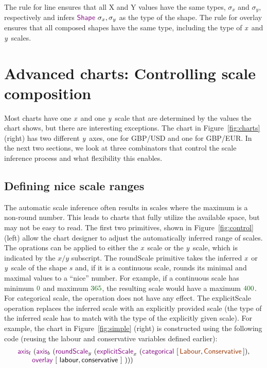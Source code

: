 \documentclass{jfp}
\newcommand{\X}{\emph{x}\ }
\newcommand{\Y}{\emph{y}\ }
\newcommand{\num}[1]{\textcolor{numclr}{#1}}
\newcommand{\strf}[1]{\textnormal{\textcolor{strclr}{\sffamily #1}}}
\newcommand{\ident}[1]{\textnormal{\textcolor{idclr}{\sffamily #1}}}
\newcommand{\kvd}[1]{\textnormal{\textcolor{kvdclr}{\sffamily #1}}}
\begin{document}
\vspace{-0.5em}
\noindent
The rule for \kvd{line} ensures that all X and Y values have the same types, $\sigma_x$ and $\sigma_y$,
respectively and infers $\kvd{Shape}~\sigma_x, \sigma_y$ as the type of the shape. The rule for
\kvd{overlay} ensures that all composed shapes have the same type, including the type of \X and \Y scales.

\section{Advanced charts: Controlling scale composition}
\label{sec:fancy}

Most charts have one \X and one \Y scale that are determined by the values the chart shows,
but there are interesting exceptions. The chart in Figure~\ref{fig:charts} (right)
has two different \Y axes, one for GBP/USD and one for GBP/EUR. In the next two sections, we look at
three combinators that control the scale inference process and what flexibility this enables.

\subsection{Defining nice scale ranges}

The automatic scale inference often results in scales where the maximum is a non-round number.
This leads to charts that fully utilize the available space, but may not be easy to read.
The first two primitives, shown in Figure~\ref{fig:control} (left) allow the chart designer
to adjust the automatically inferred range of scales.
The oprations can be applied to either the \X scale or the \Y scale, which is indicated by the
$x/y$ subscript. The \kvd{roundScale} primitive takes the inferred \X or \Y scale of the shape $s$
and, if it is a continuous scale, rounds its minimal and maximal values to a ``nice'' number.
For example, if a continuous scale has minimum $\num{0}$ and maximum $\num{365}$, the resulting
scale would have a maximum $\num{400}$. For categorical scale, the operation does not have any effect.
The \kvd{explicitScale} operation replaces the inferred scale with an explicitly
provided scale (the type of the inferred scale has to match with the type of the explicitly given
scale). For example, the chart in Figure~\ref{fig:simple} (right) is constructed using the
following code (reusing the \ident{labour} and \ident{conservative} variables defined earlier):
%
\begin{equation*}
\begin{array}{l}
\kvd{axis}_l~(\kvd{axis}_b~(\kvd{roundScale}_y~(\kvd{explicitScale}_x~(\kvd{categorical}~[\,\strf{Labour},\strf{Conservative}\,]),\\
\qquad \kvd{overlay}~[~\ident{labour}, \ident{conservative}~]~)))\\
\end{array}
\end{equation*}
\vspace{-0.75em}
\end{document}
